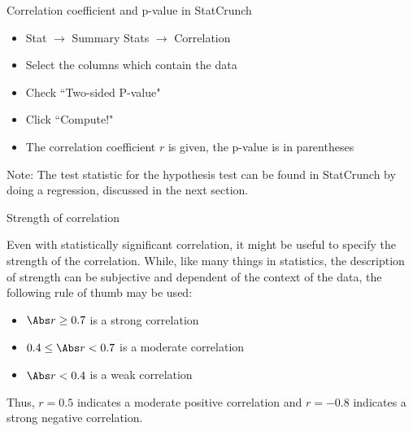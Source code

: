 \documentclass[xcolor=table, handout]{beamer}
\begin{document}
\begin{frame}{Correlation coefficient and p-value in StatCrunch}
\begin{block}{}
\large
\begin{itemize}
\item Stat $\to$ Summary Stats $\to$ Correlation
\item Select the columns which contain the data
\item Check ``Two-sided P-value"
\item Click ``Compute!"
\item The correlation coefficient $r$ is given, the p-value is in parentheses
\end{itemize} 
\end{block}
\begin{block}{}
\large
Note: The test statistic for the hypothesis test can be found in StatCrunch by doing a regression, discussed in the next section. 
\end{block}
\end{frame}

\begin{frame}{Strength of correlation}
\begin{block}{}
\large
Even with statistically significant correlation, it might be useful to specify the strength of the correlation. While, like many things in statistics, the description of strength can be subjective and dependent of the context of the data, the following rule of thumb may be used:
\begin{itemize}
\pause\item $\Abs r \ge 0.7$ is a strong correlation
\pause\item $0.4 \le \Abs r < 0.7$ is a moderate correlation
\pause\item $\Abs r < 0.4$ is a weak correlation
\end{itemize}
\pause Thus, $r=0.5$ indicates a moderate positive correlation and $r=-0.8$ indicates a strong negative correlation.
\end{block}
\end{frame}
\end{document}
